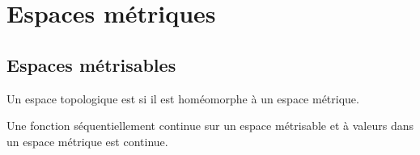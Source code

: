 
\section{Espaces métriques}

\subsection{Espaces métrisables}

\begin{definition}
    Un espace topologique est  si il est homéomorphe à un espace métrique.
\end{definition}


\begin{proposition} \label{PROPooKNVUooMbLZoy}
    Une fonction séquentiellement continue sur un espace métrisable et à valeurs dans un espace métrique est continue.
\end{proposition}

